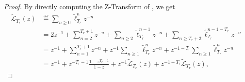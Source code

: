 \documentclass{article}
\begin{document}
    \begin{proof}
      By directly computing the Z-Transform of , we get
      \begin{align}
        \tilde{\mathcal{L}}_{T_r}(z) & \eqdef \sum_{n \geq 0} \tilde{\ell}_{T_r}^{n} z^{-n} \\
        & = 2 z^{-1} + \sum_{n = 2}^{T_r+1} z^{-n} + \sum_{n \geq 2} \tilde{\ell}_{T_r}^{n-1} z^{-n} 
        + \sum_{n \geq T_r + 2} \tilde{\ell}_{T_r}^{n-1-T_r} z^{-n} \\
        & = z^{-1} + \sum_{n = 1}^{T_r+1} z^{-n} + z^{-1}\sum_{n \geq 1} \tilde{\ell}_{T_r}^{n} z^{-n} 
        + z^{-1-T_r} \sum_{n \geq 1} \tilde{\ell}_{T_r}^{n} z^{-n} \\
        & = z^{-1} + z^{-T_r-1}\frac{1-z^{T_r + 1}}{1 - z} + z^{-1} \tilde{\mathcal{L}}_{T_r}(z) 
        + z^{-1-T_r} \tilde{\mathcal{L}}_{T_r}(z),
      \end{align}


\end{proof}
\end{document}

